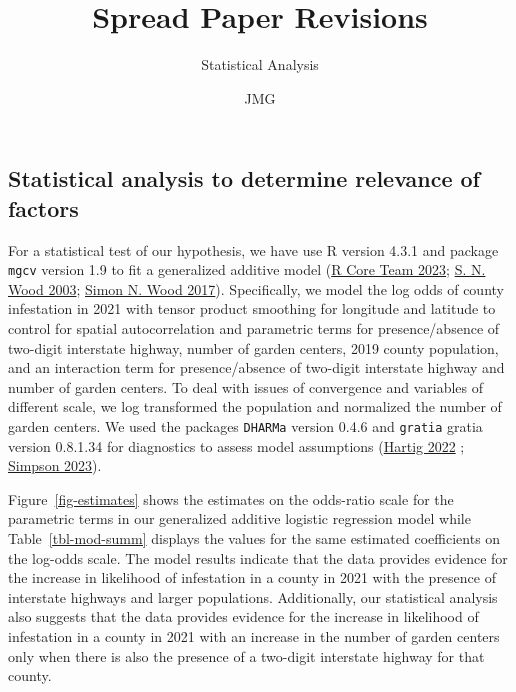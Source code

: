 \documentclass[
  letterpaper,
  DIV=11,
  numbers=noendperiod]{scrartcl}
\title{Spread Paper Revisions}
\subtitle{Statistical Analysis}
\author{JMG}
\date{}
\begin{document}
\maketitle
\ifdefined\Shaded\renewenvironment{Shaded}{\begin{tcolorbox}[boxrule=0pt, frame hidden, borderline west={3pt}{0pt}{shadecolor}, interior hidden, enhanced, breakable, sharp corners]}{\end{tcolorbox}}\fi

\hypertarget{statistical-analysis-to-determine-relevance-of-factors}{%
\subsection{Statistical analysis to determine relevance of
factors}\label{statistical-analysis-to-determine-relevance-of-factors}}

For a statistical test of our hypothesis, we have use R version 4.3.1
and package \texttt{mgcv} version 1.9 to fit a generalized additive
model (\protect\hyperlink{ref-rcore}{R Core Team 2023};
\protect\hyperlink{ref-wood2003}{S. N. Wood 2003};
\protect\hyperlink{ref-wood2017generalized}{Simon N. Wood 2017}).
Specifically, we model the log odds of county infestation in 2021 with
tensor product smoothing for longitude and latitude to control for
spatial autocorrelation and parametric terms for presence/absence of
two-digit interstate highway, number of garden centers, 2019 county
population, and an interaction term for presence/absence of two-digit
interstate highway and number of garden centers. To deal with issues of
convergence and variables of different scale, we log transformed the
population and normalized the number of garden centers. We used the
packages \texttt{DHARMa} version 0.4.6 and \texttt{gratia} gratia
version 0.8.1.34 for diagnostics to assess model assumptions
(\protect\hyperlink{ref-dharma2022}{Hartig 2022} ;
\protect\hyperlink{ref-gratia2023}{Simpson 2023}).

Figure~\ref{fig-estimates} shows the estimates on the odds-ratio scale
for the parametric terms in our generalized additive logistic regression
model while Table~\ref{tbl-mod-summ} displays the values for the same
estimated coefficients on the log-odds scale. The model results indicate
that the data provides evidence for the increase in likelihood of
infestation in a county in 2021 with the presence of interstate highways
and larger populations. Additionally, our statistical analysis also
suggests that the data provides evidence for the increase in likelihood
of infestation in a county in 2021 with an increase in the number of
garden centers only when there is also the presence of a two-digit
interstate highway for that county.
\end{document}
